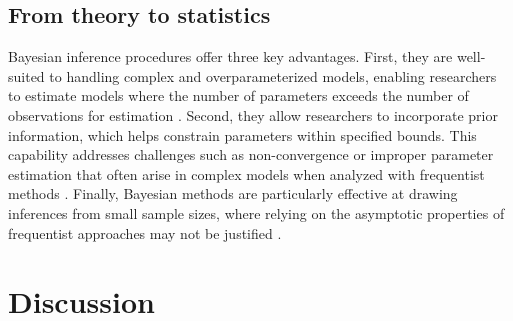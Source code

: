 \documentclass[
  authoryear,
  review,
  1p]{elsarticle}
\begin{document}
\begin{figure}


\caption{\label{fig-CJ_TM_15}}

\end{figure}%

\subsection{From theory to statistics}\label{sec-theory-statistics}

Bayesian inference procedures offer three key advantages. First, they
are well-suited to handling complex and overparameterized models,
enabling researchers to estimate models where the number of parameters
exceeds the number of observations for estimation
\citep{Baker_1998, Kim_et_al_1999}. Second, they allow researchers to
incorporate prior information, which helps constrain parameters within
specified bounds. This capability addresses challenges such as
non-convergence or improper parameter estimation that often arise in
complex models when analyzed with frequentist methods
\citep{Martin_et_al_1975, Seaman_et_al_2011}. Finally, Bayesian methods
are particularly effective at drawing inferences from small sample
sizes, where relying on the asymptotic properties of frequentist
approaches may not be justified
\citep{Baldwin_et_al_2013, Lambert_et_al_2006, Depaoli_2014}.

\section{Discussion}\label{sec-discussion}
\end{document}
